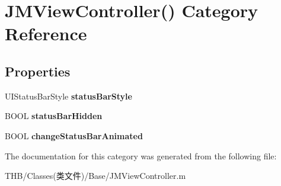 \hypertarget{category_j_m_view_controller_07_08}{}\section{J\+M\+View\+Controller() Category Reference}
\label{category_j_m_view_controller_07_08}
\subsection*{Properties}
\begin{DoxyCompactItemize}
\item 
\mbox{\label{category_j_m_view_controller_07_08_a3914ec2e2a468ed725196881a8ac6ee0}} 
U\+I\+Status\+Bar\+Style {\bfseries status\+Bar\+Style}
\item 
\mbox{\label{category_j_m_view_controller_07_08_aa848bf17a9ed215bda114be2f4d4857b}} 
B\+O\+OL {\bfseries status\+Bar\+Hidden}
\item 
\mbox{\label{category_j_m_view_controller_07_08_aada38d0df5a658d7150b47b4524e2cde}} 
B\+O\+OL {\bfseries change\+Status\+Bar\+Animated}
\end{DoxyCompactItemize}


The documentation for this category was generated from the following file\+:\begin{DoxyCompactItemize}
\item 
T\+H\+B/\+Classes(类文件)/\+Base/J\+M\+View\+Controller.\+m\end{DoxyCompactItemize}

